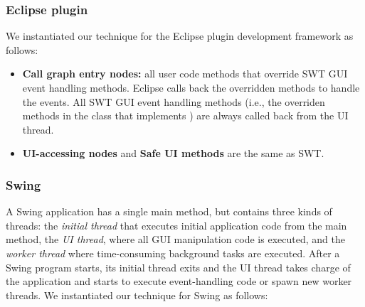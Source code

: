 \tinystep
\tinystep
\subsubsection{Eclipse plugin}

We instantiated our technique for the Eclipse plugin development framework as follows:

\smallstep
\begin{myindentpar}{-2mm}

\begin{itemize}

\item \textbf{Call graph entry nodes: } all user code methods that override
 SWT GUI event handling methods. Eclipse
calls back the overridden methods to handle the
events. All SWT GUI event handling methods (i.e., the overriden
methods in the class that implements ) are
always called back from the UI thread.

\tinystep

\item \textbf{UI-accessing nodes} and \textbf{Safe UI methods} are the same as SWT.

\end{itemize}
\end{myindentpar}

\tinystep
\tinystep
\tinystep
\subsubsection{Swing}

A Swing application has a single main method, but contains three kinds of
threads: the \textit{initial thread} that executes initial application code from the main method,
the \textit{UI thread}, where all GUI manipulation code is executed,
and the \textit{worker thread} where time-consuming background tasks are executed.
After a Swing program starts, its initial thread exits and the UI thread takes charge
of the application and starts to execute event-handling code or spawn new worker threads. 
We instantiated our technique for Swing as follows:

